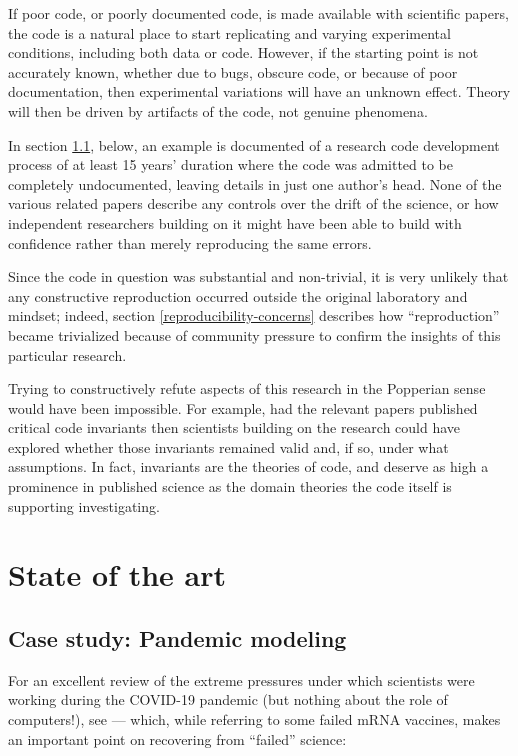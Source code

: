 \documentclass{comjnl}
\begin{document}
If poor code, or poorly documented code, is made available with scientific papers, the code is a natural place to start replicating and varying experimental conditions, including both data or code. However, if the starting point is not accurately known, whether due to bugs, obscure code, or because of poor documentation, then experimental variations will have an unknown effect. Theory will then be driven by artifacts of the code, not genuine phenomena. 

In section \ref{section-pandemic-modeling}, below, an example is documented of a research code development process of at least 15 years' duration where the code was admitted to be completely undocumented, leaving details in just one author's head. None of the various related papers describe any controls over the drift of the science, or how independent researchers building on it might have been able to build with confidence rather than merely reproducing the same errors. 

Since the code in question was substantial and non-trivial, it is very unlikely that any constructive reproduction occurred outside the original laboratory and mindset; indeed, section \ref{reproducibility-concerns} describes how ``reproduction'' became trivialized because of community pressure to confirm the insights of this particular research. 

Trying to constructively refute aspects of this research in the Popperian sense \cite{popper-conjectures-refutations} would have been impossible. For example, had the relevant papers published critical code invariants then scientists building on the research could have explored whether those invariants remained valid and, if so, under what assumptions. In fact, invariants are the theories of code, and deserve as high a prominence in published  science as the domain theories the code itself is supporting investigating. 


\section{State of the art}%

\subsection{Case study: Pandemic modeling}
\label{section-pandemic-modeling}
For an excellent review of the extreme pressures under which scientists were working during the COVID-19 pandemic (but nothing about the role of computers!), see \cite{preventable-book} --- which, while referring to some failed mRNA vaccines, makes an important point on recovering from ``failed'' science:
\end{document}
